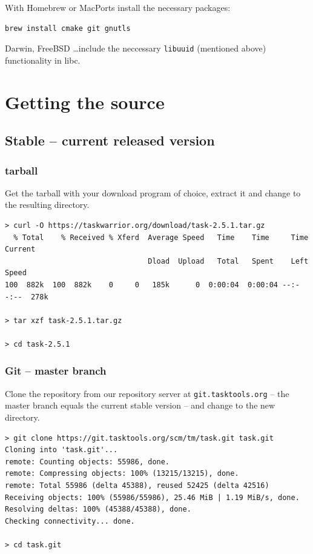 \documentclass[DIV=12,fontsize=12pt,parskip=half,paper=portrait,%
               headheight=61pt,headinclude=yes,%
               footheight=15pt,footinclude=no]{scrartcl}
\begin{document}
With Homebrew or MacPorts install the necessary packages:

\begin{lstlisting}
brew install cmake git gnutls\end{lstlisting}

Darwin, FreeBSD \ldots include the neccessary \texttt{libuuid} (mentioned above) functionality in libc.

\section{Getting the source}

\subsection{Stable -- current released version}

\subsubsection{tarball}

Get the tarball with your download program of choice, extract it and change to the resulting directory.

\begin{lstlisting}
> curl -O https://taskwarrior.org/download/task-2.5.1.tar.gz
  % Total    % Received % Xferd  Average Speed   Time    Time     Time  Current
                                 Dload  Upload   Total   Spent    Left  Speed
100  882k  100  882k    0     0   185k      0  0:00:04  0:00:04 --:--:--  278k

> tar xzf task-2.5.1.tar.gz

> cd task-2.5.1\end{lstlisting}

\subsubsection{Git -- master branch}

Clone the repository from our repository server at \texttt{git.tasktools.org} -- the master branch equals the current stable version -- and change to the new directory.

\begin{lstlisting}
> git clone https://git.tasktools.org/scm/tm/task.git task.git
Cloning into 'task.git'...
remote: Counting objects: 55986, done.
remote: Compressing objects: 100% (13215/13215), done.
remote: Total 55986 (delta 45388), reused 52425 (delta 42516)
Receiving objects: 100% (55986/55986), 25.46 MiB | 1.19 MiB/s, done.
Resolving deltas: 100% (45388/45388), done.
Checking connectivity... done.

> cd task.git\end{lstlisting}
\end{document}
